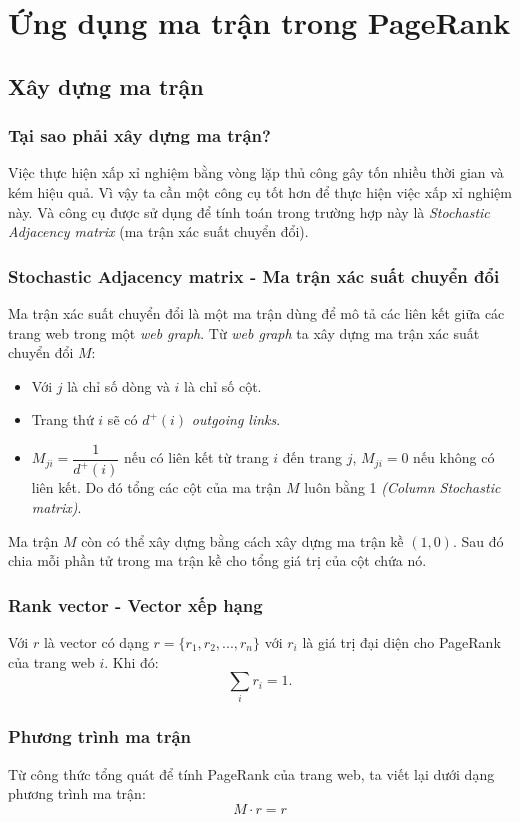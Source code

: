 \chapter{Ứng dụng ma trận trong PageRank}
      
    \section{Xây dựng ma trận} 
    \subsection{Tại sao phải xây dựng ma trận?}
    Việc thực hiện xấp xỉ nghiệm bằng vòng lặp thủ công gây tốn nhiều thời gian và kém hiệu quả. Vì vậy ta cần một công cụ tốt hơn để thực hiện việc xấp xỉ nghiệm này. Và công cụ được sử dụng để tính toán trong trường hợp này là \emph{Stochastic Adjacency matrix} (ma trận xác suất chuyển đổi).
        \subsection{Stochastic Adjacency matrix - Ma trận xác suất chuyển đổi  \cite{Stochastic_Matrices}}
            Ma trận xác suất chuyển đổi là một ma trận dùng để mô tả các liên kết giữa các trang web trong một \emph{web graph}. 
            Từ \emph{web graph} ta xây dựng ma trận xác suất chuyển đổi $M$:
            \begin{itemize}
                \item Với $j$ là chỉ số dòng và $i$ là chỉ số cột.
                \item Trang thứ $i$ sẽ có $d^+(i)$ \emph{outgoing links}.
                \item $M_{ji} = \dfrac{1}{d^+(i)}$ nếu có liên kết từ trang $i$ đến trang $j$, $M_{ji} = 0$ nếu không có liên kết. Do đó tổng các cột của ma trận $M$ luôn bằng 1 \emph{(Column Stochastic matrix)}.
            \end{itemize}
         Ma trận $M$ còn có thể xây dựng bằng cách xây dựng ma trận kề $(1,0)$. Sau đó chia mỗi phần tử trong ma trận kề cho tổng giá trị của cột chứa nó. 
        \subsection{Rank vector - Vector xếp hạng}
            Với $r$ là vector có dạng $r = \{ r_1, r_2, ..., r_n\}$ với $r_i$ là giá trị đại diện cho PageRank của trang web $i$. Khi đó:$$\sum_i{r_i}  = 1.$$
        \subsection{Phương trình ma trận}
            Từ công thức tổng quát để tính PageRank của trang web, ta viết lại dưới dạng phương trình ma trận:
            $$\boxed{M \cdot r = r}$$
            
